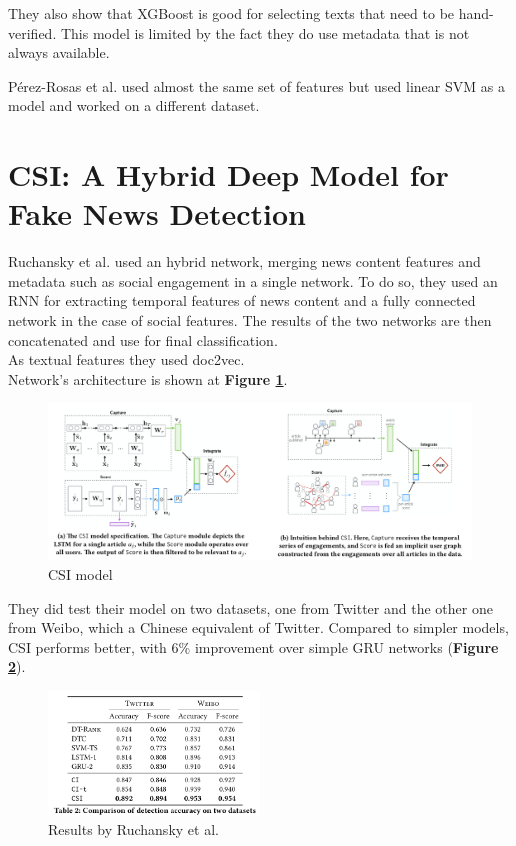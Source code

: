 They also show that XGBoost is good for selecting texts that need to be hand-verified. This model is limited by the fact they do use metadata that is not always available. 

P\'erez-Rosas et al.\cite{Perez-Rosas2017} used almost the same set of features but used linear SVM as a model and worked on a different dataset.

\section{CSI: A Hybrid Deep Model for Fake News Detection}
Ruchansky et al.\cite{Ruchansky2017} used an hybrid network, merging news content features and metadata such as social engagement in a single network. To do so, they used an RNN for extracting temporal features of news content and a fully connected network in the case of social features. The results of the two networks are then concatenated and use for final classification. \\

As textual features they used doc2vec\cite{Le2014}. \\

Network's architecture is shown at \textbf{Figure \ref{fig:chap1:Ruchansky}}.

\begin{figure}[h]
 \centering
 \includegraphics[width=\textwidth]{images/chap1_bis/rev2.png}
 \caption{CSI model}
 \label{fig:chap1:Ruchansky}
\end{figure}

They did test their model on two datasets, one from Twitter and the other one from Weibo, which a Chinese equivalent of Twitter. Compared to simpler models, CSI performs better, with $6\%$ improvement over simple GRU networks (\textbf{Figure \ref{fig:chap1:Ruchansky2}}). 

\begin{figure}[h]
 \centering
 \includegraphics[width=0.5\textwidth]{images/chap1_bis/rev3.png}
 \caption{Results by Ruchansky et al. }
 \label{fig:chap1:Ruchansky2}
\end{figure}

